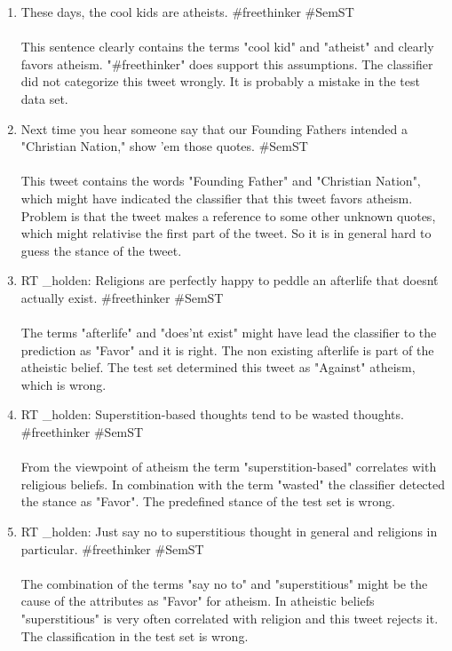 \documentclass[a4paper,12pt,twoside]{article}
\begin{document}
\begin{enumerate}
\item These days, the cool kids are atheists.  \#freethinker \#SemST\\
\\
This sentence clearly contains the terms "cool kid" and "atheist" and clearly favors atheism. "\#freethinker" does support this assumptions. The classifier did not categorize this tweet wrongly. It is probably a mistake in the test data set.
\\
\item Next time you hear someone say that our Founding Fathers intended a "Christian Nation," show 'em those quotes. \#SemST\\
\\
This tweet contains the words "Founding Father" and "Christian Nation", which might have indicated the classifier that this tweet favors atheism. Problem is that the tweet makes a reference to some other unknown quotes, which might relativise the first part of the tweet. So it is in general hard to guess the stance of the tweet.
\\
\item RT \@br\_holden: Religions are perfectly happy to peddle an afterlife that doesn\'t actually exist.  \#freethinker \#SemST \\
\\
The terms "afterlife" and "does'nt exist" might have lead the classifier to the prediction as "Favor" and it is right. The non existing afterlife is part of the atheistic belief. The test set determined this tweet as "Against" atheism, which is wrong. 
\\
\item RT \@br\_holden: Superstition-based thoughts tend to be wasted thoughts.  \#freethinker \#SemST\\
\\
From the viewpoint of atheism the term "superstition-based" correlates with religious beliefs. In combination with the term "wasted" the classifier detected the stance as "Favor". The predefined stance of the test set is wrong. 
\\
\item RT \@br\_holden: Just say no to superstitious thought in general and religions in particular.  \#freethinker \#SemST\\
\\
The combination of the terms "say no to" and "superstitious" might be the cause of the attributes as "Favor" for atheism. In atheistic beliefs "superstitious" is very often correlated with religion and this tweet rejects it. The classification in the test set is wrong.  
\\
\end{enumerate}
\end{document}
